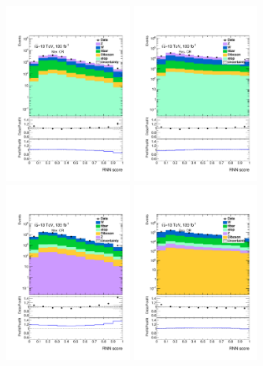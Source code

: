 \begin{figure}[H]
    \centering
    \includegraphics[width=0.37\textwidth]{figures/validation/Region_distRNN_DCRVjetMer_BMin0_J0_incJet1_L0_T0_incFat1_Y6051_incTag1_Fat1.pdf}
    \includegraphics[width=0.37\textwidth]{figures/validation/Region_distRNN_DCRVjetFid_BMin0_T0_Y6051_incTag1_J2_L0_incJet1.pdf}
    \includegraphics[width=0.37\textwidth]{figures/validation/Region_distRNN_DCRVjetMerged_BMin0_J0_incJet1_L1_T0_incFat1_Y6051_incTag1_Fat1.pdf}
    \includegraphics[width=0.37\textwidth]{figures/validation/Region_distRNN_DCRVjetTight_BMin0_T0_Y6051_incTag1_J2_L1_incJet1.pdf}

\end{figure}
